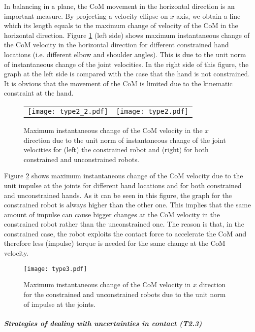 In balancing in a plane, the CoM movement in the horizontal direction is an
important measure. By projecting a velocity ellipse on $x$ axis, we obtain a
line which its length equals to the maximum change of velocity of the CoM in
the horizontal direction. Figure \ref{type2} (left side) shows maximum
instantaneous change of the CoM velocity in the horizontal direction for
different constrained hand locations (i.e. different elbow and shoulder
angles). This is due to the unit norm of instantaneous change of the joint
velocities. In the right side of this figure, the graph at the left side is
compared with the case that the hand is not constrained. It is obvious that
the movement of the CoM is limited due to the kinematic constraint at the
hand.
\begin{figure}[!t]
  \centering
  \begin{tabular}{lr}
    \texttt{[image: type2\_2.pdf]}
    &  
    \texttt{[image: type2.pdf]}
  \end{tabular}
  \caption{Maximum instantaneous change of the CoM velocity in the $x$
    direction due to the unit norm of instantaneous change of the joint
    velocities for (left) the constrained robot and (right) for both
    constrained and unconstrained robots.}
  \label{type2}
\end{figure}

Figure \ref{type3} shows maximum instantaneous change of the CoM velocity due
to the unit impulse at the joints for different hand locations and for both
constrained and unconstrained hands. As it can be seen in this figure, the
graph for the constrained robot is always higher than the other one. This
implies that the same amount of impulse can cause bigger changes at the CoM
velocity in the constrained robot rather than the unconstrained one. The
reason is that, in the constrained case, the robot exploits the contact force
to accelerate the CoM and therefore less (impulse) torque is needed for the
same change at the CoM velocity.
\begin{figure}[!t]
  \centering
  \texttt{[image: type3.pdf]}
  \caption{Maximum instantaneous change of the CoM velocity in $x$ direction
    for the constrained and unconstrained robots due to the unit norm of
    impulse at the joints.}
  \label{type3}
\end{figure}







\subparagraph{Strategies of dealing with uncertainties in contact (T2.3)}

